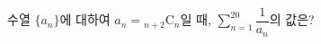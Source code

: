 수열 $\{a_n\}$에 대하여 $a_n={}_{n+2}\mathrm{C}_{n}$일 때, $\displaystyle\sum_{n=1}^{20} \dfrac{1}{a_n}$의 값은?
